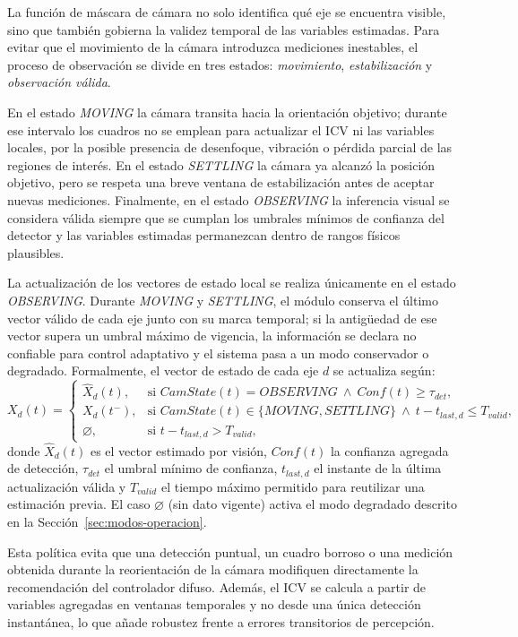 La función de máscara de cámara no solo identifica qué eje se encuentra visible, sino que también
gobierna la validez temporal de las variables estimadas. Para evitar que el movimiento de la cámara
introduzca mediciones inestables, el proceso de observación se divide en tres estados:
\emph{movimiento}, \emph{estabilización} y \emph{observación válida}.

En el estado \textit{MOVING} la cámara transita hacia la orientación objetivo; durante ese intervalo
los cuadros no se emplean para actualizar el ICV ni las variables locales, por la posible presencia de
desenfoque, vibración o pérdida parcial de las regiones de interés. En el estado \textit{SETTLING} la
cámara ya alcanzó la posición objetivo, pero se respeta una breve ventana de estabilización antes de
aceptar nuevas mediciones. Finalmente, en el estado \textit{OBSERVING} la inferencia visual se
considera válida siempre que se cumplan los umbrales mínimos de confianza del detector y las variables
estimadas permanezcan dentro de rangos físicos plausibles.

La actualización de los vectores de estado local se realiza únicamente en el estado \textit{OBSERVING}.
Durante \textit{MOVING} y \textit{SETTLING}, el módulo conserva el último vector válido de cada eje
junto con su marca temporal; si la antigüedad de ese vector supera un umbral máximo de vigencia, la
información se declara no confiable para control adaptativo y el sistema pasa a un modo conservador o
degradado. Formalmente, el vector de estado de cada eje $d$ se actualiza según:
\[
X_d(t)=
\begin{cases}
\hat{X}_d(t), & \text{si } CamState(t)=\textit{OBSERVING}\ \wedge\ Conf(t)\geq \tau_{det},\\[2pt]
X_d(t^{-}), & \text{si } CamState(t)\in\{\textit{MOVING},\textit{SETTLING}\}\ \wedge\ t-t_{last,d}\leq T_{valid},\\[2pt]
\varnothing, & \text{si } t-t_{last,d}>T_{valid},
\end{cases}
\]
donde $\hat{X}_d(t)$ es el vector estimado por visión, $Conf(t)$ la confianza agregada de detección,
$\tau_{det}$ el umbral mínimo de confianza, $t_{last,d}$ el instante de la última actualización válida
y $T_{valid}$ el tiempo máximo permitido para reutilizar una estimación previa. El caso $\varnothing$
(sin dato vigente) activa el modo degradado descrito en la Sección~\ref{sec:modos-operacion}.

Esta política evita que una detección puntual, un cuadro borroso o una medición obtenida durante la
reorientación de la cámara modifiquen directamente la recomendación del controlador difuso. Además, el
ICV se calcula a partir de variables agregadas en ventanas temporales y no desde una única detección
instantánea, lo que añade robustez frente a errores transitorios de percepción.

